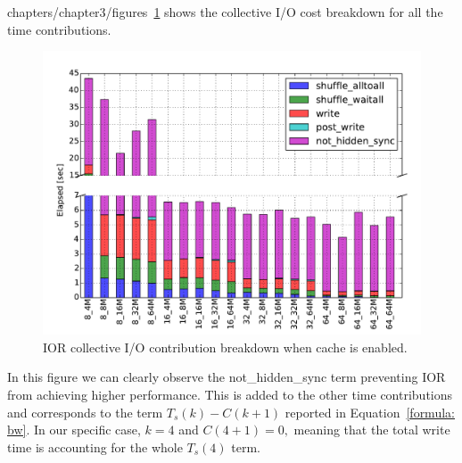 chapters/chapter3/figures~\ref{figure: ior-elaps-enable} shows the collective I/O cost breakdown for all the time contributions. 
\begin{figure}[htb]
  \centering
  \includegraphics[width=0.95\columnwidth]{chapters/chapter3/figures/ior_32GB_30sec_enable}
  \caption{IOR collective I/O contribution breakdown when cache is enabled.}
  \label{figure: ior-elaps-enable}
\end{figure}
In this figure we can clearly observe the not\_hidden\_sync term preventing IOR from achieving higher performance. This is added to the other time contributions and corresponds to the term $T_s(k)-C(k+1)$ reported in Equation~\ref{formula: bw}. In our specific case, $k = 4$ and $C(4+1) = 0,$ meaning that the total write time is accounting for the whole $T_s(4)$ term.


